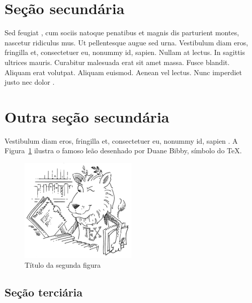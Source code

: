 \lipsum[8-9]



\section{Seção secundária}


\lipsum[10]

Sed feugiat , cum sociis natoque penatibus et magnis dis parturient montes, nascetur ridiculus mus. Ut pellentesque augue sed urna. Vestibulum diam eros, fringilla et, consectetuer eu, nonummy id, sapien. Nullam at lectus. In sagittis ultrices mauris. Curabitur malesuada erat sit amet massa. Fusce blandit. Aliquam erat volutpat. Aliquam euismod. Aenean vel lectus. Nunc imperdiet justo nec dolor \cite{BirdEA2014,Botelho2021,BrandaoEA2012}.


\section{Outra seção secundária}

Vestibulum diam eros, fringilla et, consectetuer eu, nonummy id, sapien \cite{BoyceDiprima2015,CostaAndrade2022}. A Figura~\ref{fig2} ilustra o famoso leão desenhado por Duane Bibby, símbolo do \TeX.


\lipsum[12]


\begin{figure}[htb]
\centering
\caption{Título da segunda figura}\label{fig2}
\includegraphics[width=0.5\textwidth]{./dados/figuras/tex_lion.png}
\end{figure}



\lipsum[13-14]



\subsection{Seção terciária}

\lipsum[15-17]
